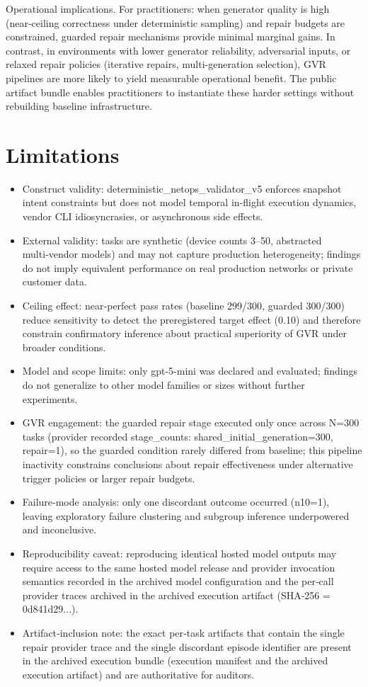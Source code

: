 \documentclass[conference]{IEEEtran}
\begin{document}
Operational implications. For practitioners: when generator quality is high (near‑ceiling correctness under deterministic sampling) and repair budgets are constrained, guarded repair mechanisms provide minimal marginal gains. In contrast, in environments with lower generator reliability, adversarial inputs, or relaxed repair policies (iterative repairs, multi-generation selection), GVR pipelines are more likely to yield measurable operational benefit. The public artifact bundle enables practitioners to instantiate these harder settings without rebuilding baseline infrastructure.

\section{Limitations}
\begin{itemize}
\item Construct validity: deterministic\_netops\_validator\_v5 enforces snapshot intent constraints but does not model temporal in‑flight execution dynamics, vendor CLI idiosyncrasies, or asynchronous side effects.
\item External validity: tasks are synthetic (device counts 3--50, abstracted multi‑vendor models) and may not capture production heterogeneity; findings do not imply equivalent performance on real production networks or private customer data.
\item Ceiling effect: near‑perfect pass rates (baseline 299/300, guarded 300/300) reduce sensitivity to detect the preregistered target effect (0.10) and therefore constrain confirmatory inference about practical superiority of GVR under broader conditions.
\item Model and scope limits: only gpt-5-mini was declared and evaluated; findings do not generalize to other model families or sizes without further experiments.
\item GVR engagement: the guarded repair stage executed only once across N=300 tasks (provider recorded stage\_counts: shared\_initial\_generation=300, repair=1), so the guarded condition rarely differed from baseline; this pipeline inactivity constrains conclusions about repair effectiveness under alternative trigger policies or larger repair budgets.
\item Failure‑mode analysis: only one discordant outcome occurred (n10=1), leaving exploratory failure clustering and subgroup inference underpowered and inconclusive.
\item Reproducibility caveat: reproducing identical hosted model outputs may require access to the same hosted model release and provider invocation semantics recorded in the archived model configuration and the per‑call provider traces archived in the archived execution artifact (SHA‑256 = 0d841d29...).
\item Artifact‑inclusion note: the exact per‑task artifacts that contain the single repair provider trace and the single discordant episode identifier are present in the archived execution bundle (execution manifest and the archived execution artifact) and are authoritative for auditors.
\end{itemize}
\end{document}
